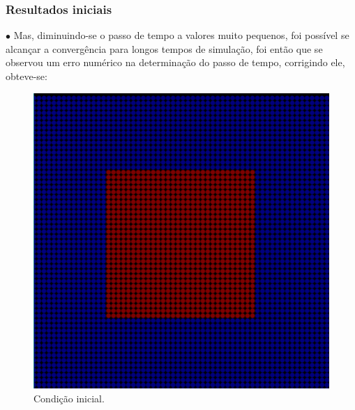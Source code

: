 \documentclass[xcolor=dvipsnames,10pt,aspectratio=169]{beamer}
\begin{document}
	\begin{frame}
	\frametitle{Resultados iniciais}
	
	$\bullet$ Mas, diminuindo-se o passo de tempo a valores muito pequenos, foi possível se alcançar a convergência para longos tempos de simulação, foi então que se observou um erro numérico na determinação do passo de tempo, corrigindo ele, obteve-se:
	
	
	\begin{minipage}[h!]{0.30\textwidth}
		\begin{figure}[h!]
			\centering
			\includegraphics[trim = {1cm 1cm 1cm 1cm}, clip , angle=0, scale=0.3]{sucesso_!}
			\caption{Condição inicial.}
		\end{figure}
	\end{minipage}
	\begin{minipage}[h!]{0.30\textwidth}
		\begin{figure}[h!]
			\centering

\end{figure}
\end{minipage}
\end{frame}
\end{document}
